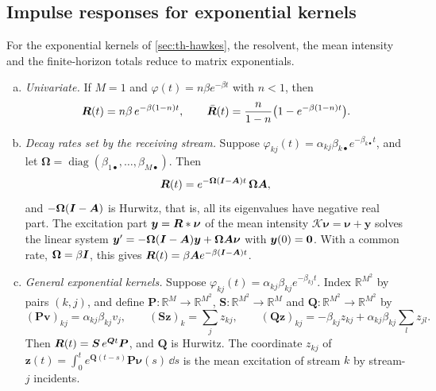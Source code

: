 \subsection{Impulse responses for exponential kernels}\label{sec:at-irf}

For the exponential kernels of \cref{sec:th-hawkes}, the resolvent, the mean intensity
and the finite-horizon totals reduce to matrix exponentials.

\begin{proposition}\label{prop:irf}
\begin{enumerate}[(a)]
  \item \emph{Univariate.} If $M=1$ and $\varphi(t)=n\beta e^{-\beta t}$ with $n<1$,
  then
  \begin{equation}\label{eq:at-irf-uni}
    \bm{R}(t)=n\beta\,e^{-\beta(1-n)t},\qquad
    \bar{\bm{R}}(t)=\frac{n}{1-n}\bigl(1-e^{-\beta(1-n)t}\bigr).
  \end{equation}
  \item \emph{Decay rates set by the receiving stream.} Suppose
  $\varphi_{kj}(t)=\alpha_{kj}\beta_{k\bullet}e^{-\beta_{k\bullet}t}$, and let
  $\bm\Omega=\operatorname{diag}(\beta_{1\bullet},\dots,\beta_{M\bullet})$. Then
  \begin{equation}\label{eq:at-irf-row}
    \bm{R}(t)=e^{-\bm\Omega(\bm{I}-\bm{A})t}\,\bm\Omega\bm{A},
  \end{equation}
  and $-\bm\Omega(\bm{I}-\bm{A})$ is Hurwitz, that is, all its eigenvalues have negative
  real part. The excitation part $\bm y=\bm{R}*\bm\nu$ of the mean intensity
  $\mathcal K\bm\nu=\bm\nu+\bm y$ solves the linear system
  $\bm y'=-\bm\Omega(\bm{I}-\bm{A})\bm y+\bm\Omega\bm{A}\bm\nu$ with $\bm y(0)=\mathbf{0}$.
  With a common rate, $\bm\Omega=\beta\bm{I}$, this gives
  $\bm{R}(t)=\beta\bm{A} e^{-\beta(\bm{I}-\bm{A})t}$.
  \item \emph{General exponential kernels.} Suppose
  $\varphi_{kj}(t)=\alpha_{kj}\beta_{kj}e^{-\beta_{kj}t}$. Index $\mathbb R^{M^2}$ by
  pairs $(k,j)$, and define $\bm P:\mathbb R^M\to\mathbb R^{M^2}$,
  $\bm S:\mathbb R^{M^2}\to\mathbb R^M$ and $\bm Q:\mathbb R^{M^2}\to\mathbb R^{M^2}$ by
  \[
    (\bm P\bm v)_{kj}=\alpha_{kj}\beta_{kj}v_j,\qquad
    (\bm S\bm z)_k=\sum_{j}z_{kj},\qquad
    (\bm Q\bm z)_{kj}=-\beta_{kj}z_{kj}+\alpha_{kj}\beta_{kj}\sum_{l}z_{jl}.
  \]
  Then $\bm{R}(t)=\bm S\,e^{\bm Qt}\bm P$, and $\bm Q$ is Hurwitz. The coordinate
  $z_{kj}$ of $\bm z(t)=\int_0^te^{\bm Q(t-s)}\bm P\bm\nu(s)\,\dd s$ is the mean
  excitation of stream $k$ by stream-$j$ incidents.

\end{enumerate}
\end{proposition}
